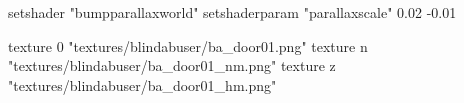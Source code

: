 	setshader "bumpparallaxworld"
	setshaderparam "parallaxscale" 0.02 -0.01

		texture 0 "textures/blindabuser/ba_door01.png"
		texture n "textures/blindabuser/ba_door01_nm.png"
		texture z "textures/blindabuser/ba_door01_hm.png"
